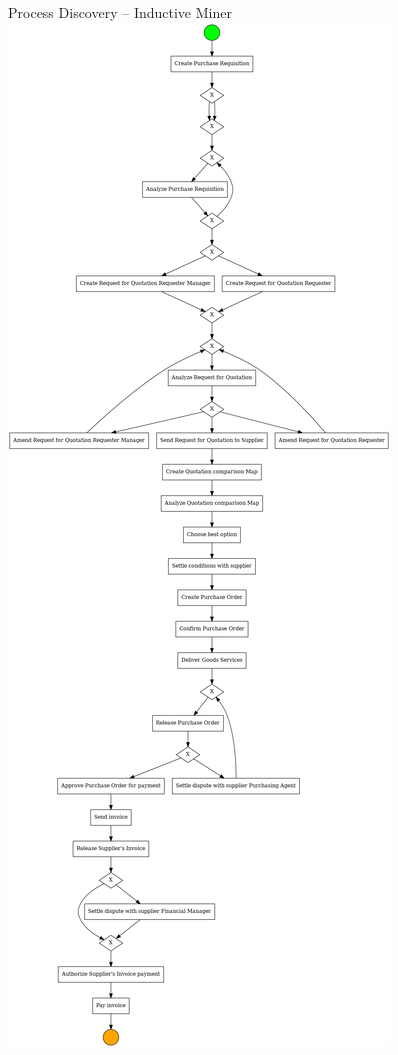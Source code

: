 \documentclass[ignorenonframetext,xcolor=x11names]{beamer}
\begin{document}
\begin{frame}{Process Discovery -- Inductive Miner}
\centering
\includegraphics[width=.8\textwidth]{bpmn.png}
\end{frame}
\end{document}
